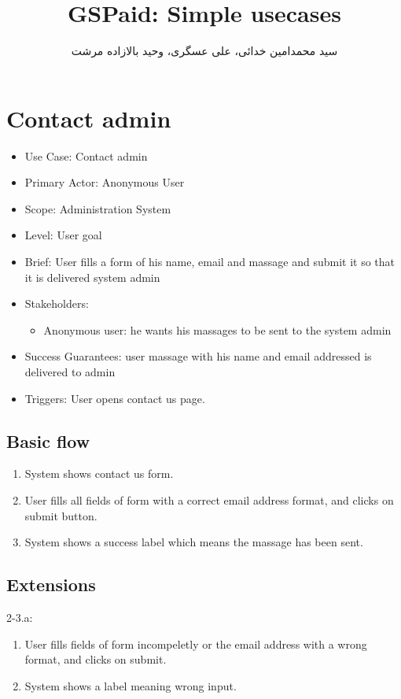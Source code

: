 \documentclass[11pt]{article}
\title{
GSPaid: Simple usecases
}
\author{سید محمد‌امین خدائی، علی عسگری، وحید بالازاده مرشت}
\begin{document}
\maketitle
\section{Contact admin}
\begin{itemize}
\item
Use Case: Contact admin
\item
Primary Actor: Anonymous User
\item
Scope: Administration System
\item
Level: User goal
\item
Brief: User fills a form of his name, email and massage and submit it so that it is delivered system admin
\item
Stakeholders:
\begin{itemize}
\item
Anonymous user: he wants his massages to be sent to the system admin
\end{itemize}
\item
Success Guarantees: user massage with his name and email addressed is delivered to admin
\item
Triggers:
User opens contact us page.
\end{itemize}

\subsection{Basic flow}
\begin{enumerate}
\item
System shows contact us form.
\item
User fills all fields of form with a correct email address format, and clicks on submit button.
\item
System shows a success label which means the massage has been sent.
\end{enumerate}

\subsection{Extensions}
2-3.a:
\begin{enumerate}
\item
User fills fields of form incompeletly or the email address with a wrong format, and clicks on submit.
\item
System shows a label meaning wrong input.
\end{enumerate}
\end{document}

